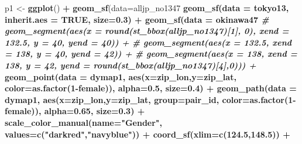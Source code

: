 \documentclass[
]{article}
\newenvironment{Shaded}{\begin{snugshade}}{\end{snugshade}}
\newcommand{\CommentTok}[1]{\textcolor[rgb]{0.56,0.35,0.01}{\textit{#1}}}
\newcommand{\DataTypeTok}[1]{\textcolor[rgb]{0.13,0.29,0.53}{#1}}
\newcommand{\DecValTok}[1]{\textcolor[rgb]{0.00,0.00,0.81}{#1}}
\newcommand{\FloatTok}[1]{\textcolor[rgb]{0.00,0.00,0.81}{#1}}
\newcommand{\KeywordTok}[1]{\textcolor[rgb]{0.13,0.29,0.53}{\textbf{#1}}}
\newcommand{\NormalTok}[1]{#1}
\newcommand{\OperatorTok}[1]{\textcolor[rgb]{0.81,0.36,0.00}{\textbf{#1}}}
\newcommand{\OtherTok}[1]{\textcolor[rgb]{0.56,0.35,0.01}{#1}}
\newcommand{\StringTok}[1]{\textcolor[rgb]{0.31,0.60,0.02}{#1}}
\begin{document}
\begin{Shaded}
\begin{Highlighting}[]
\NormalTok{p1 <-}\StringTok{ }\KeywordTok{ggplot}\NormalTok{() }\OperatorTok{+}\StringTok{ }
\StringTok{  }\KeywordTok{geom_sf}\NormalTok{(}\DataTypeTok{data=}\NormalTok{alljp_no1347 }\OperatorTok{%>%}\StringTok{ }\KeywordTok{st_simplify}\NormalTok{(}\DataTypeTok{dTolerance =} \FloatTok{0.01}\NormalTok{), }\DataTypeTok{size=}\FloatTok{0.3}\NormalTok{) }\OperatorTok{+}\StringTok{ }
\StringTok{  }\KeywordTok{geom_sf}\NormalTok{(}\DataTypeTok{data =}\NormalTok{ tokyo13, }\DataTypeTok{inherit.aes =} \OtherTok{TRUE}\NormalTok{, }\DataTypeTok{size=}\FloatTok{0.3}\NormalTok{) }\OperatorTok{+}\StringTok{ }
\StringTok{  }\KeywordTok{geom_sf}\NormalTok{(}\DataTypeTok{data =}\NormalTok{ okinawa47 }\OperatorTok{%>%}\StringTok{ }\KeywordTok{st_simplify}\NormalTok{(}\DataTypeTok{dTolerance =} \FloatTok{0.01}\NormalTok{), }\DataTypeTok{inherit.aes =} \OtherTok{TRUE}\NormalTok{, }\DataTypeTok{size=}\FloatTok{0.3}\NormalTok{) }\OperatorTok{+}\StringTok{   }
\StringTok{  }\CommentTok{# geom_segment(aes(x = round(st_bbox(alljp_no1347)[1], 0), xend = 132.5, y = 40, yend = 40)) + }
\StringTok{  }\CommentTok{# geom_segment(aes(x = 132.5, xend = 138, y = 40, yend = 42)) + }
\StringTok{  }\CommentTok{# geom_segment(aes(x = 138, xend = 138, y = 42, yend = round(st_bbox(alljp_no1347)[4],0))) + }
\StringTok{  }\KeywordTok{geom_point}\NormalTok{(}\DataTypeTok{data =}\NormalTok{ dymap1, }\KeywordTok{aes}\NormalTok{(}\DataTypeTok{x=}\NormalTok{zip_lon,}\DataTypeTok{y=}\NormalTok{zip_lat, }\DataTypeTok{color=}\KeywordTok{as.factor}\NormalTok{(}\DecValTok{1}\OperatorTok{-}\NormalTok{female)), }\DataTypeTok{alpha=}\FloatTok{0.5}\NormalTok{, }\DataTypeTok{size=}\FloatTok{0.4}\NormalTok{) }\OperatorTok{+}\StringTok{ }
\StringTok{  }\KeywordTok{geom_path}\NormalTok{(}\DataTypeTok{data =}\NormalTok{ dymap1, }\KeywordTok{aes}\NormalTok{(}\DataTypeTok{x=}\NormalTok{zip_lon,}\DataTypeTok{y=}\NormalTok{zip_lat, }\DataTypeTok{group=}\NormalTok{pair_id, }\DataTypeTok{color=}\KeywordTok{as.factor}\NormalTok{(}\DecValTok{1}\OperatorTok{-}\NormalTok{female)), }\DataTypeTok{alpha=}\FloatTok{0.65}\NormalTok{, }\DataTypeTok{size=}\FloatTok{0.3}\NormalTok{) }\OperatorTok{+}\StringTok{ }
\StringTok{  }\KeywordTok{scale_color_manual}\NormalTok{(}\DataTypeTok{name=}\StringTok{"Gender"}\NormalTok{, }\DataTypeTok{values=}\KeywordTok{c}\NormalTok{(}\StringTok{"darkred"}\NormalTok{,}\StringTok{"navyblue"}\NormalTok{)) }\OperatorTok{+}\StringTok{ }
\StringTok{  }\KeywordTok{coord_sf}\NormalTok{(}\DataTypeTok{xlim=}\KeywordTok{c}\NormalTok{(}\FloatTok{124.5}\NormalTok{,}\FloatTok{148.5}\NormalTok{)) }\OperatorTok{+}\StringTok{ }
}}
\end{Highlighting}
\end{Shaded}
\end{document}
